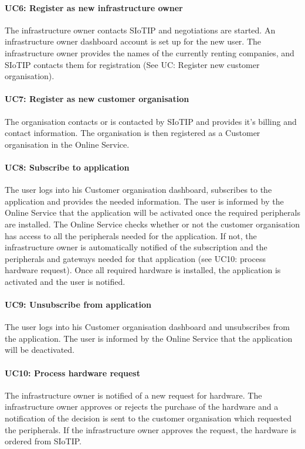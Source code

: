 \documentclass[english]{sareport}
\begin{document}
\paragraph{UC6: Register as new infrastructure owner}
The infrastructure owner contacts SIoTIP and negotiations are started. An infrastructure owner dashboard account is set up for the new user. The infrastructure owner provides the names of the currently renting companies, and SIoTIP contacts them for registration (See UC: Register new customer organisation).

\paragraph{UC7: Register as new customer organisation}
The organisation contacts or is contacted by SIoTIP and provides it's billing and contact information. The organisation is then registered as a Customer organisation in the Online Service.

\paragraph{UC8: Subscribe to application}
The user logs into his Customer organisation dashboard, subscribes to the application and provides the needed information. The user is informed by the Online Service that the application will be activated once the required peripherals are installed. The Online Service checks whether or not the customer organisation has access to all the peripherals needed for the application. If not, the infrastructure owner is automatically notified of the subscription and the peripherals and gateways needed for that application (see UC10: process hardware request). Once all required hardware is installed, the application is activated and the user is notified.

\paragraph{UC9: Unsubscribe from application}
The user logs into his Customer organisation dashboard and unsubscribes from the application. The user is informed by the Online Service that the application will be deactivated.

\paragraph{UC10: Process hardware request}
The infrastructure owner is notified of a new request for hardware. The infrastructure owner approves or rejects the purchase of the hardware and a notification of the decision is sent to the customer organisation which requested the peripherals. If the infrastructure owner approves the request, the hardware is ordered from SIoTIP.
\end{document}
